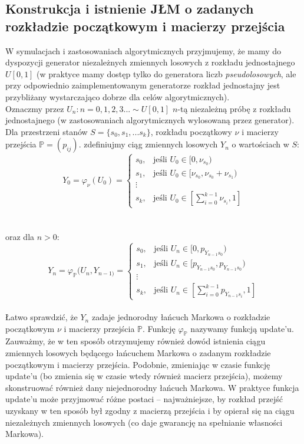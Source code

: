 \documentclass[a4paper]{article}
\begin{document}
\subsection{Konstrukcja i istnienie JŁM o zadanych rozkładzie początkowym i macierzy przejścia}
W symulacjach i zastosowaniach algorytmicznych przyjmujemy, że mamy do dyspozycji generator niezależnych zmiennych losowych z rozkładu jednostajnego $U[0,1]$ (w praktyce mamy dostęp tylko do generatora liczb \textit{pseudolosowych}, ale przy odpowiednio zaimplementowanym generatorze rozkład jednostajny jest przybliżany wystarczająco dobrze dla celów algorytmicznych). \\
Oznaczmy przez $U_n : n = 0,1,2,3... \sim U[0,1]$ $n$-tą niezależną próbę z rozkładu jednostajnego (w zastosowaniach algorytmicznych wylosowaną przez generator). Dla przestrzeni stanów $S = \{s_0, s_1, ... s_k\}$, rozkładu początkowy $\nu$ i macierzy przejścia $\mathbb{P} = (p_{ij})$. zdefiniujmy ciąg zmiennych losowych $Y_n$  o wartościach w $S$:
    $$Y_0 = \varphi_{\nu}(U_0) =
    \begin{cases}
      s_0, & \text{jeśli } U_0 \in [0, \nu_{s_0}) \\
      s_1, & \text{jeśli } U_0 \in [\nu_{s_0}, \nu_{s_0}+\nu_{s_1}) \\
      \vdots \\
      s_k, & \text{jeśli } U_0 \in [\sum\limits_{i=0}^{k-1} \nu_{s_i}, 1]
    \end{cases}$$\\
    \\oraz dla $n > 0$: $$Y_n= \varphi_{\mathbb{P}}(U_n, Y_{n-1)} =
    \begin{cases}
      s_0, & \text{jeśli } U_n \in [0, p_{Y_{n-1} s_0}) \\
      s_1, & \text{jeśli } U_n \in [p_{Y_{n-1} s_0}, p_{Y_{n-1} s_0}) \\
      \vdots \\
      s_k, & \text{jeśli } U_n \in [\sum\limits_{i=0}^{k-1} p_{Y_{n-1} s_i}, 1]
    \end{cases}$$
\\
Łatwo sprawdzić, że $Y_n$ zadaje jednorodny łańcuch Markowa o rozkładzie początkowym $\nu$ i macierzy przejścia $\mathbb{P}$. Funkcję $\varphi_{\mathbb{P}}$ nazywamy funkcją update'u. Zauważmy, że w ten sposób otrzymujemy również dowód istnienia ciągu zmiennych losowych będącego łańcuchem Markowa o zadanym rozkładzie początkowym i macierzy przejścia.
Podobnie, zmieniając w czasie funkcję update'u (bo zmienia się w czasie wtedy również macierz przejścia), możemy skonstruować również dany niejednorodny łańcuch Markowa. W praktyce funkcja update'u może przyjmować różne postaci – najważniejsze, by rozkład przejść uzyskany w ten sposób był zgodny z macierzą przejścia i by opierał się na ciągu niezależnych zmiennych losowych (co daje gwarancję na spełnianie własności Markowa).
\end{document}
